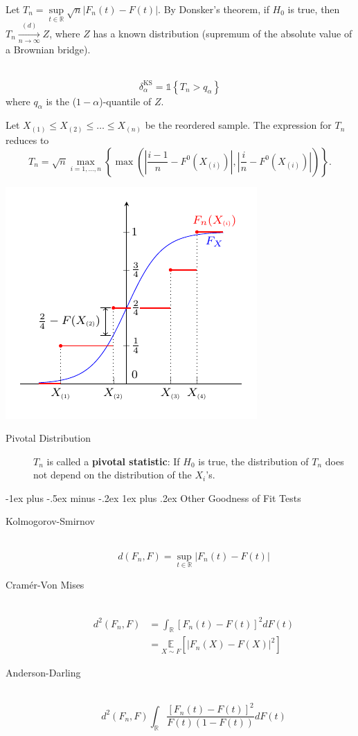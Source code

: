 \documentclass[a4paper, 10pt,landscape]{article}
\makeatletter
\renewcommand{\subsubsection}{\@startsection{subsubsection}{3}{0mm}%
                                {-1ex plus -.5ex minus -.2ex}%
                                {1ex plus .2ex}%
                                {\normalfont\small\bfseries}}
\makeatother
\begin{document}
\begin{multicols*}{3}
\begin{description}
	\item Let $T_n=\sup\limits_{t\in\mathbb{R}}\sqrt{n}\left|F_n(t)-F(t)\right|$. By Donsker's theorem, if $H_0$ is true, then $T_n\xrightarrow[n\rightarrow\infty]{(d)}Z$, where $Z$ has a known distribution (supremum of the absolute value of a Brownian bridge).
	\item[KS test with asymptotic level $\alpha$:] ~
	$$\delta_\alpha^\text{KS}=\mathds{1}\left\{T_n>q_\alpha\right\}$$
	where $q_\alpha$ is the ($1-\alpha$)-quantile of $Z$.
	\item Let $X_{(1)}\leq X_{(2)}\leq\dots\leq X_{(n)}$ be the reordered sample. The expression for $T_n$ reduces to
	$$T_n=\sqrt{n}\max\limits_{i=1,\dots,n}\left\{\max\left(\left|\dfrac{i-1}{n}-F^0\left(X_{(i)}\right)\right|,\left|\dfrac{i}{n}-F^0\left(X_{(i)}\right)\right|\right)\right\}.$$
\end{description}
\begin{center}
	\includegraphics*[width=0.6\columnwidth]{ks.pdf}
\end{center}

\begin{description}
	\item[Pivotal Distribution] $T_n$ is called a {\bf pivotal statistic}: If $H_0$ is true, the distribution of $T_n$ does not depend on the distribution of the $X_i$'s.
\end{description}

\subsubsection{Other Goodness of Fit Tests}

\begin{description}
	\item[Kolmogorov-Smirnov] ~
	$$d\left(F_n,F\right)=\sup\limits_{t\in\mathbb{R}}\left|F_n(t)-F(t)\right|$$
	\item[Cram\'er-Von Mises] ~
	\begin{align*}
		d^2\left(F_n,F\right)&=\int_{\mathbb{R}}\left[F_n(t)-F(t)\right]^2dF(t)\\
		&=\underset{X\sim F}{\mathbb{E}}\left[\left|F_n(X)-F(X)\right|^2\right]
	\end{align*}
	\item[Anderson-Darling] ~
	\[d^2\left(F_n,F\right)\int_{\mathbb{R}}\dfrac{\left[F_n(t)-F(t)\right]^2}{F(t)\left(1-F(t)\right)}dF(t)\]
\end{description}

\end{multicols*}
\end{document}

